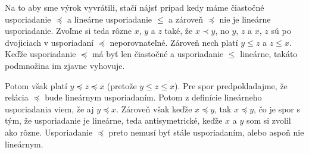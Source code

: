 
Na to aby sme výrok vyvrátili, stačí nájsť prípad kedy máme čiastočné 
usporiadanie $\preceq$ a lineárne usporiadanie $\leq$ a zároveň 
$\preccurlyeq$ nie je lineárne usporiadanie. Zvoľme si teda rôzne 
$x$, $y$ a $z$ také, že $x\prec y$, no $y$, $z$ a  $x$, $z$ sú po
dvojiciach v usporiadaní $\preceq$ neporovnateľné. Zároveň nech platí 
$y\leq z$ a $z\leq x$. Keďže usporiadanie $\preceq$ má byť len 
čiastočné a usporiadanie $\leq$ lineárne, takáto podmnožina im zjavne 
vyhovuje. 

Potom však platí $y\preccurlyeq z\preccurlyeq x$ (pretože 
$y\leq z\leq x$). Pre spor predpokladajme, že relácia $\preccurlyeq$ 
bude lineárnym usporiadaním. Potom z definície lineárneho usporiadania 
viem, že aj $y\preccurlyeq x$. Zároveň však keďže $x\preceq y$, tak 
$x\preccurlyeq y$, čo je spor s tým, že usporiadanie je lineárne, teda 
antisymetrické, keďže $x$ a $y$ som si zvolil ako rôzne. Usporiadanie 
$\preccurlyeq$ preto nemusí byť stále usporiadaním, alebo aspoň nie 
lineárnym.

